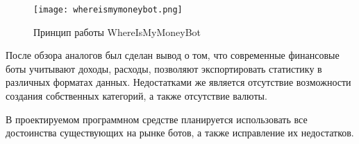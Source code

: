 \begin{figure}
	\centering
	\texttt{[image: whereismymoneybot.png]} 
	\caption{Принцип работы WhereIsMyMoneyBot}
	\label{fig:analysis:analogues:whereismymoneybot}
\end{figure}

После обзора аналогов был сделан вывод о том, что современные финансовые боты учитывают доходы, расходы, позволяют экспортировать статистику в различных форматах данных. Недостатками же является отсутствие возможности создания собственных категорий, а также отсутствие валюты.

В проектируемом программном средстве планируется использовать все достоинства существующих на рынке ботов, а также исправление их недостатков.


